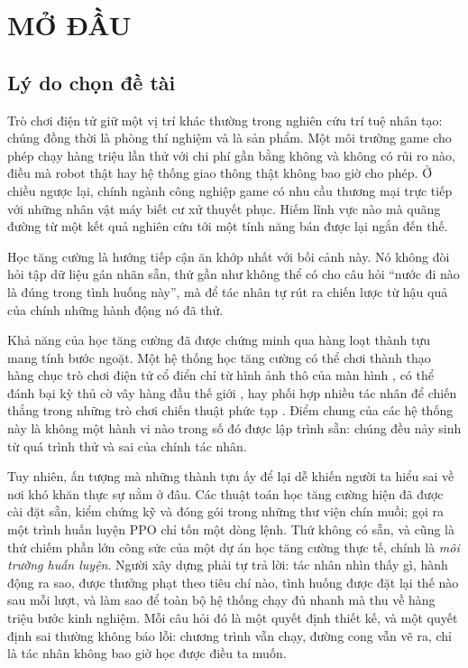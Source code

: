 
\section{MỞ ĐẦU}
\label{ch:intro}

\subsection{Lý do chọn đề tài}

\indent Trò chơi điện tử giữ một vị trí khác thường trong nghiên cứu trí tuệ nhân tạo:
chúng đồng thời là phòng thí nghiệm và là sản phẩm. Một môi trường game cho phép chạy
hàng triệu lần thử với chi phí gần bằng không và không có rủi ro nào, điều mà robot
thật hay hệ thống giao thông thật không bao giờ cho phép. Ở chiều ngược lại, chính
ngành công nghiệp game có nhu cầu thương mại trực tiếp với những nhân vật máy biết cư
xử thuyết phục. Hiếm lĩnh vực nào mà quãng đường từ một kết quả nghiên cứu tới một
tính năng bán được lại ngắn đến thế.

\indent Học tăng cường là hướng tiếp cận ăn khớp nhất với bối cảnh này. Nó không đòi
hỏi tập dữ liệu gán nhãn sẵn, thứ gần như không thể có cho câu hỏi ``nước đi nào là
đúng trong tình huống này'', mà để tác nhân tự rút ra chiến lược từ hậu quả của chính
những hành động nó đã thử.

\indent Khả năng của học tăng cường đã được chứng minh qua hàng loạt thành tựu mang
tính bước ngoặt. Một hệ thống học tăng cường có thể chơi thành thạo hàng chục trò chơi
điện tử cổ điển chỉ từ hình ảnh thô của màn hình \cite{mnih2015humanlevel}, có thể
đánh bại kỳ thủ cờ vây hàng đầu thế giới \cite{silver2016mastering}, hay phối hợp
nhiều tác nhân để chiến thắng trong những trò chơi chiến thuật phức tạp
\cite{openai2019dota, vinyals2019grandmaster}. Điểm chung của các hệ thống này là
không một hành vi nào trong số đó được lập trình sẵn: chúng đều nảy sinh từ quá trình
thử và sai của chính tác nhân.

\indent Tuy nhiên, ấn tượng mà những thành tựu ấy để lại dễ khiến người ta hiểu sai về
nơi khó khăn thực sự nằm ở đâu. Các thuật toán học tăng cường hiện đã được cài đặt sẵn,
kiểm chứng kỹ và đóng gói trong những thư viện chín muồi; gọi ra một trình huấn luyện
PPO chỉ tốn một dòng lệnh. Thứ không có sẵn, và cũng là thứ chiếm phần lớn công sức của
một dự án học tăng cường thực tế, chính là \textit{môi trường huấn luyện}. Người xây
dựng phải tự trả lời: tác nhân nhìn thấy gì, hành động ra sao, được thưởng phạt theo
tiêu chí nào, tình huống được đặt lại thế nào sau mỗi lượt, và làm sao để toàn bộ hệ
thống chạy đủ nhanh mà thu về hàng triệu bước kinh nghiệm. Mỗi câu hỏi đó là một quyết
định thiết kế, và một quyết định sai thường không báo lỗi: chương trình vẫn chạy, đường
cong vẫn vẽ ra, chỉ là tác nhân không bao giờ học được điều ta muốn.

